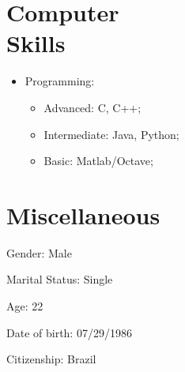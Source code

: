 \documentclass[margin,line]{resume}
\begin{document}
\begin{resume}
    \section{\mysidestyle Computer\\Skills} 

    \begin{itemize}        
        \item Programming:
        \begin{itemize}
        		\item Advanced: C, C++;
        		\item Intermediate: Java, Python;
        		\item Basic: Matlab/Octave;
        \end{itemize}
    \end{itemize}


		
		
			
		
		

    \section{\mysidestyle Miscellaneous}
     \begin {list1}
     	\item[] Gender: Male
     	\item[] Marital Status: Single
     	\item[] Age: 22
     	\item[] Date of birth: 07/29/1986
     	\item[] Citizenship: Brazil 
     \end{list1}
   
   


\end{resume}
\end{document}

